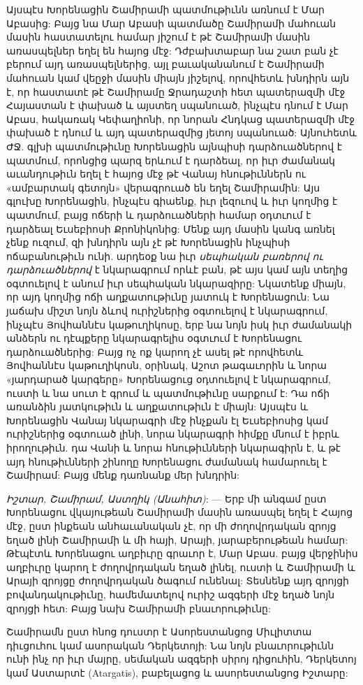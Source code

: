 \documentclass{article}
\begin{document}
{Այսպէս Խորենացին Շամիրամի պատմութիւնն առնում է Մար Աբասից: Բայց նա Մար Աբասի պատմածը Շամիրամի մահուան մասին հաստատելու համար յիշում է թէ Շամիրամի մասին առասպելներ եղել են հայոց մէջ: Դժբախտաբար նա շատ բան չէ բերում այդ առասպելներից, այլ բաւականանում է Շամիրամի մահուան կամ վեըջի մասին միայն յիշելով, որովհետև խնդիրն այն է, որ հաստատէ թէ Շամիրամը Ջրադաշտի հետ պատերազմի մէջ Հայաստան է փախած և այստեղ սպանուած, ինչպէս դնում է Մար Աբաս, հակառակ Կեփաղիոնի, որ նորան Հնդկաց պատերազմի մէջ փախած է դնում և այդ պատերազմից յետոյ սպանուած: Այնուհետև ԺՋ. գլխի պատմութիւնը Խորենացին այնպիսի դարձուածներով է պատմում, որոնցից պարզ երևում է դարձեալ, որ իւր ժամանակ աւանդութիւն եղել է հայոց մէջ թէ Վանայ հնութիւններն ու «ամբարտակ գետոյն» վերագրուած են եղել Շամիրամին: Այս գլուխը Խորենացին, ինչպէս գիաենք, իւր լեզուով և իւր կողմից է պատմում, բայց ոճերի և դարձուածների համար օդտւում է դարձեալ Եւսեբիոսի Քրոնիկոնից: Մենք այդ մասին կանգ առնել չենք ուզում, զի խնդիրն այն չէ թէ Խորենացին ինչպիսի ոճաբանութիւն ունի. արդեօք նա իւր \emph{սեպհական բառերով ու դարձուածներով} է նկարագրում որևէ բան, թէ այս կամ այն տեղից օգտուելով է անում իւր սեպհական նկարազիրը: Նկատենք միայն, որ այդ կողմից ոճի աղքատութիւնը յատուկ է Խորենացուն: Նա յաճախ միշտ նոյն ձևով ուրիշներից օգտուելով է նկարագրում, ինչպէս Յովհաննէս կաթուղիկոսը, երբ նա նոյն իսկ իւր ժամանակի անձերն ու դէպքերը նկարագրելիս օգտւում է Խորենացու դարձուածներից: Բայց ոչ ոք կարող չէ ասել թէ որովհետև Յովհաննէս կաթուղիկոսն, օրինակ, Աշոտ թագաւորին և նորա «յարդարած կարգերը» Խորենացուց օդտուելով է նկարագրում, ուստի և նա սուտ է գրում և պատմութիւնը սարքում է: Դա ոճի առանձին յատկութիւն և աղքատութիւն է միայն: Այսպէս և Խորենացին Վանայ նկարագրի մէջ ինչքան էլ Եւսեբիոսից կամ ուրիշներից օգտուած լինի, նորա նկարագրի հիմքը մնում է իբրև իրողութիւն. դա Վանի և նորա հնութիւնների նկարագիրն է, և թէ այդ հնութիւնների շինողը Խորենացու ժամանակ համարուել է Շամիրամ: Բայց մենք դառնանք մեր խնդրին:

\emph{Իշտար, Շամիրամ, Աստղիկ (Անահիտ)}: — Երբ մի անգամ ըստ Խորենացու վկայութեան Շամիրամի մասին առասպել եղել է Հայոց մէջ, ըստ ինքեան անհաւանական չէ, որ մի ժողովրդական զրոյց եղած լինի Շամիրամի և մի հայի, Արայի, յարաբերութեան համար: Թէպէտև Խորենացու աղբիւրը գրաւոր է, Մար Աբաս. բայց վերջինիս աղբիւրը կարող է ժողովրդական եղած լինել, ուստի և Շամիրամի և Արայի զրոյցը ժողովրդական ծագում ունենալ: Տեսնենք այդ զրոյցի բովանդակութիւնը, համեմատելով ուրիշ ազգերի մէջ եղած նոյն զրոյցի հետ: Բայց նախ Շամիրամի բնաւորութիւնը:

Շամիրամն ըստ հնոց դուստր է Ասորեստանցոց Միւլիտտա դիւցուհու կամ ասորական Դերկետոյի: Նա նոյն բնաւորութիւնն ունի ինչ որ իւր մայրը, սեմական ազգերի սիրոյ դիցուհին, Դերկետոյ կամ Աստարտէ (Atargatis), բաբելացոց և ասորեստանցոց Իշտարը:

}
\end{document}

